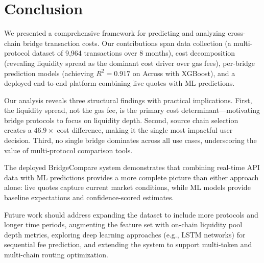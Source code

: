 \section{Conclusion}\label{sec: conclusion}

We presented a comprehensive framework for predicting and analyzing cross-chain bridge transaction costs. Our contributions span data collection (a multi-protocol dataset of 9{,}964 transactions over 8 months), cost decomposition (revealing liquidity spread as the dominant cost driver over gas fees), per-bridge prediction models (achieving $R^2 = 0.917$ on Across with XGBoost), and a deployed end-to-end platform combining live quotes with ML predictions.

Our analysis reveals three structural findings with practical implications. First, the liquidity spread, not the gas fee, is the primary cost determinant---motivating bridge protocols to focus on liquidity depth. Second, source chain selection creates a $46.9\times$ cost difference, making it the single most impactful user decision. Third, no single bridge dominates across all use cases, underscoring the value of multi-protocol comparison tools.

The deployed BridgeCompare system demonstrates that combining real-time API data with ML predictions provides a more complete picture than either approach alone: live quotes capture current market conditions, while ML models provide baseline expectations and confidence-scored estimates.

Future work should address expanding the dataset to include more protocols and longer time periods, augmenting the feature set with on-chain liquidity pool depth metrics, exploring deep learning approaches (e.g., LSTM networks) for sequential fee prediction, and extending the system to support multi-token and multi-chain routing optimization.
